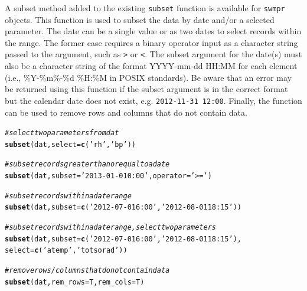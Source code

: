 \documentclass[10pt,letterpaper]{article}\usepackage[]{graphicx}\usepackage[]{color}
\makeatletter
\newcommand{\hlstr}[1]{\textcolor[rgb]{0.192,0.494,0.8}{#1}}%
\newcommand{\hlcom}[1]{\textcolor[rgb]{0.678,0.584,0.686}{\textit{#1}}}%
\newcommand{\hlstd}[1]{\textcolor[rgb]{0.345,0.345,0.345}{#1}}%
\newcommand{\hlkwc}[1]{\textcolor[rgb]{0.333,0.667,0.333}{#1}}%
\newcommand{\hlkwd}[1]{\textcolor[rgb]{0.737,0.353,0.396}{\textbf{#1}}}%
\newenvironment{kframe}{%
 \def\at@end@of@kframe{}%
 \ifinner\ifhmode%
  \def\at@end@of@kframe{\end{minipage}}%
  \begin{minipage}{\columnwidth}%
 \fi\fi%
 \def\FrameCommand##1{\hskip\@totalleftmargin \hskip-\fboxsep
 \colorbox{shadecolor}{##1}\hskip-\fboxsep
     \hskip-\linewidth \hskip-\@totalleftmargin \hskip\columnwidth}%
 \MakeFramed {\advance\hsize-\width
   \@totalleftmargin\z@ \linewidth\hsize
   \@setminipage}}%
 {\par\unskip\endMakeFramed%
 \at@end@of@kframe}
\newenvironment{knitrout}{}{} %
\makeatother
\begin{document}
A subset method added to the existing \texttt{subset} function is available for \texttt{swmpr} objects.  This function is used to subset the data by date and/or a selected parameter.  The date can be a single value or as two dates to select records within the range. The former case requires a binary operator input as a character string passed to the argument, such as \texttt{>} or \texttt{<}.  The subset argument for the date(s) must also be a character string of the format YYYY-mm-dd HH:MM for each element (i.e., \%Y-\%m\%-\%d \%H:\%M in POSIX standards).  Be aware that an error may be returned using this function if the subset argument is in the correct format but the calendar date does not exist, e.g. \texttt{2012-11-31 12:00}.  Finally, the function can be used to remove rows and columns that do not contain data. 

\begin{knitrout}
\color{fgcolor}\begin{kframe}
\begin{alltt}
\hlcom{# select two parameters from dat}
\hlkwd{subset}\hlstd{(dat,} \hlkwc{select} \hlstd{=} \hlkwd{c}\hlstd{(}\hlstr{'rh'}\hlstd{,} \hlstr{'bp'}\hlstd{))}

\hlcom{# subset records greater than or equal to a date}
\hlkwd{subset}\hlstd{(dat,} \hlkwc{subset} \hlstd{=} \hlstr{'2013-01-01 0:00'}\hlstd{,} \hlkwc{operator} \hlstd{=} \hlstr{'>='}\hlstd{)}

\hlcom{# subset records within a date range}
\hlkwd{subset}\hlstd{(dat,} \hlkwc{subset} \hlstd{=} \hlkwd{c}\hlstd{(}\hlstr{'2012-07-01 6:00'}\hlstd{,} \hlstr{'2012-08-01 18:15'}\hlstd{))}

\hlcom{# subset records within a date range, select two parameters}
\hlkwd{subset}\hlstd{(dat,} \hlkwc{subset} \hlstd{=} \hlkwd{c}\hlstd{(}\hlstr{'2012-07-01 6:00'}\hlstd{,} \hlstr{'2012-08-01 18:15'}\hlstd{),}
  \hlkwc{select} \hlstd{=} \hlkwd{c}\hlstd{(}\hlstr{'atemp'}\hlstd{,} \hlstr{'totsorad'}\hlstd{))}

\hlcom{# remove rows/columns that do not contain data}
\hlkwd{subset}\hlstd{(dat,} \hlkwc{rem_rows} \hlstd{= T,} \hlkwc{rem_cols} \hlstd{= T)}
\end{alltt}
\end{kframe}
\end{knitrout}
\end{document}

